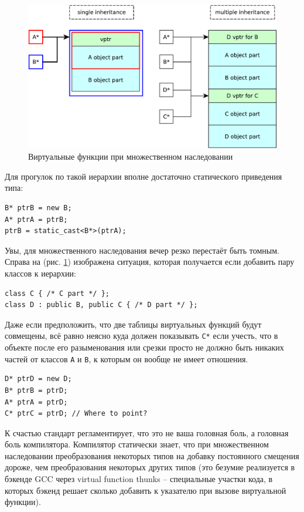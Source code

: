 \documentclass[a4paper,12pt,oneside]{article}
\begin{document}
\begin{figure}[h!]
\centering
\includegraphics[width=1.0\textwidth]{illustrations/multinh-crop.pdf}
\caption{Виртуальные функции при множественном наследовании}
\label{fig:multinh-crop}
\end{figure}

Для прогулок по такой иерархии вполне достаточно статического приведения типа:

\begin{lstlisting}
B* ptrB = new B;
A* ptrA = ptrB;
ptrB = static_cast<B*>(ptrA);
\end{lstlisting}

Увы, для множественного наследования вечер резко перестаёт быть томным. Справа на (рис. \ref{fig:multinh-crop}) изображена ситуация, которая получается если добавить пару классов к иерархии:

\begin{lstlisting}
class C { /* C part */ };
class D : public B, public C { /* D part */ };
\end{lstlisting}

Даже если предположить, что две таблицы виртуальных функций будут совмещены, всё равно неясно куда должен показывать \lstinline!С*! если учесть, что в объекте после его разыменования или срезки просто не должно быть никаких частей от классов \lstinline!A! и \lstinline!B!, к которым он вообще не имеет отношения.

\begin{lstlisting}
D* ptrD = new D;
B* ptrB = ptrD;
A* ptrA = ptrD;
C* ptrC = ptrD; // Where to point?
\end{lstlisting}

К счастью стандарт регламентирует, что это не ваша головная боль, а головная боль компилятора. Компилятор статически знает, что при множественном наследовании преобразования некоторых типов на добавку постоянного смещения дороже, чем преобразования некоторых других типов (это безумие реализуется в бэкенде GCC через virtual function thunks -- специальные участки кода, в которых бэкенд решает сколько добавить к указателю при вызове виртуальной функции).
\end{document}
